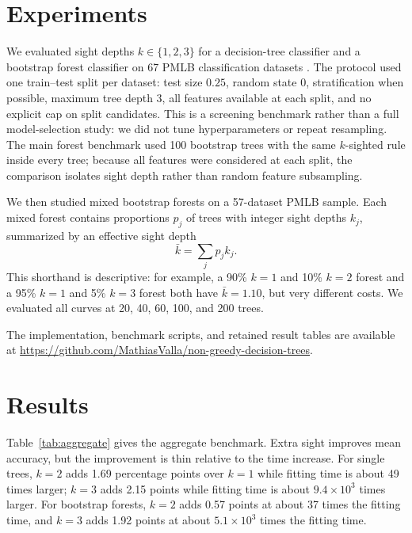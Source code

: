\documentclass[final,5p,times]{elsarticle}
\begin{document}
\section{Experiments}

We evaluated sight depths $k\in\{1,2,3\}$ for a decision-tree classifier and a bootstrap forest classifier on 67 PMLB classification datasets \cite{olson2017pmlb}. The protocol used one train--test split per dataset: test size $0.25$, random state $0$, stratification when possible, maximum tree depth $3$, all features available at each split, and no explicit cap on split candidates. This is a screening benchmark rather than a full model-selection study: we did not tune hyperparameters or repeat resampling. The main forest benchmark used 100 bootstrap trees with the same $k$-sighted rule inside every tree; because all features were considered at each split, the comparison isolates sight depth rather than random feature subsampling.

We then studied mixed bootstrap forests on a 57-dataset PMLB sample. Each mixed forest contains proportions $p_j$ of trees with integer sight depths $k_j$, summarized by an effective sight depth
\[
\bar{k}=\sum_j p_j k_j .
\]
This shorthand is descriptive: for example, a 90\% $k=1$ and 10\% $k=2$ forest and a 95\% $k=1$ and 5\% $k=3$ forest both have $\bar{k}=1.10$, but very different costs. We evaluated all curves at 20, 40, 60, 100, and 200 trees.

The implementation, benchmark scripts, and retained result tables are available at \href{https://github.com/MathiasValla/non-greedy-decision-trees}{https://github.com/MathiasValla/non-greedy-decision-trees}.

\section{Results}

Table~\ref{tab:aggregate} gives the aggregate benchmark. Extra sight improves mean accuracy, but the improvement is thin relative to the time increase. For single trees, $k=2$ adds 1.69 percentage points over $k=1$ while fitting time is about 49 times larger; $k=3$ adds 2.15 points while fitting time is about $9.4\times 10^3$ times larger. For bootstrap forests, $k=2$ adds 0.57 points at about 37 times the fitting time, and $k=3$ adds 1.92 points at about $5.1\times 10^3$ times the fitting time.
\end{document}
